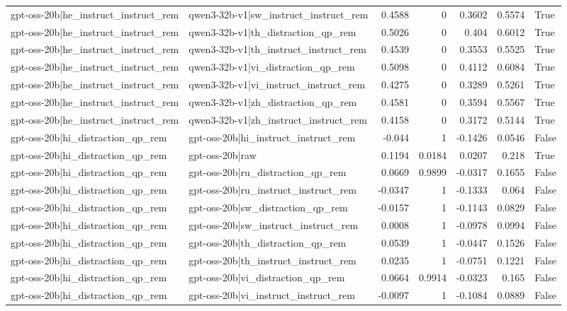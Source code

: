 \begin{table}
\begin{tabular}{l l r r r r l}
gpt-oss-20b|he_instruct_instruct_rem & qwen3-32b-v1|sw_instruct_instruct_rem & 0.4588 & 0 & 0.3602 & 0.5574 & True \\
gpt-oss-20b|he_instruct_instruct_rem & qwen3-32b-v1|th_distraction_qp_rem & 0.5026 & 0 & 0.404 & 0.6012 & True \\
gpt-oss-20b|he_instruct_instruct_rem & qwen3-32b-v1|th_instruct_instruct_rem & 0.4539 & 0 & 0.3553 & 0.5525 & True \\
gpt-oss-20b|he_instruct_instruct_rem & qwen3-32b-v1|vi_distraction_qp_rem & 0.5098 & 0 & 0.4112 & 0.6084 & True \\
gpt-oss-20b|he_instruct_instruct_rem & qwen3-32b-v1|vi_instruct_instruct_rem & 0.4275 & 0 & 0.3289 & 0.5261 & True \\
gpt-oss-20b|he_instruct_instruct_rem & qwen3-32b-v1|zh_distraction_qp_rem & 0.4581 & 0 & 0.3594 & 0.5567 & True \\
gpt-oss-20b|he_instruct_instruct_rem & qwen3-32b-v1|zh_instruct_instruct_rem & 0.4158 & 0 & 0.3172 & 0.5144 & True \\
gpt-oss-20b|hi_distraction_qp_rem & gpt-oss-20b|hi_instruct_instruct_rem & -0.044 & 1 & -0.1426 & 0.0546 & False \\
gpt-oss-20b|hi_distraction_qp_rem & gpt-oss-20b|raw & 0.1194 & 0.0184 & 0.0207 & 0.218 & True \\
gpt-oss-20b|hi_distraction_qp_rem & gpt-oss-20b|ru_distraction_qp_rem & 0.0669 & 0.9899 & -0.0317 & 0.1655 & False \\
gpt-oss-20b|hi_distraction_qp_rem & gpt-oss-20b|ru_instruct_instruct_rem & -0.0347 & 1 & -0.1333 & 0.064 & False \\
gpt-oss-20b|hi_distraction_qp_rem & gpt-oss-20b|sw_distraction_qp_rem & -0.0157 & 1 & -0.1143 & 0.0829 & False \\
gpt-oss-20b|hi_distraction_qp_rem & gpt-oss-20b|sw_instruct_instruct_rem & 0.0008 & 1 & -0.0978 & 0.0994 & False \\
gpt-oss-20b|hi_distraction_qp_rem & gpt-oss-20b|th_distraction_qp_rem & 0.0539 & 1 & -0.0447 & 0.1526 & False \\
gpt-oss-20b|hi_distraction_qp_rem & gpt-oss-20b|th_instruct_instruct_rem & 0.0235 & 1 & -0.0751 & 0.1221 & False \\
gpt-oss-20b|hi_distraction_qp_rem & gpt-oss-20b|vi_distraction_qp_rem & 0.0664 & 0.9914 & -0.0323 & 0.165 & False \\
gpt-oss-20b|hi_distraction_qp_rem & gpt-oss-20b|vi_instruct_instruct_rem & -0.0097 & 1 & -0.1084 & 0.0889 & False \\

\end{tabular}
\end{table}
